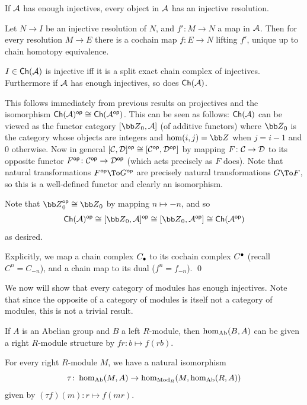 \blemm

    If ${{\cal A}}$ has enough injectives, every object in ${{\cal A}}$ has an injective resolution.

\elemm

\bthrm[title=Comparison theorem]

    Let $N\to I$ be an injective resolution of $N$, and $f'\colon M\to N$ a map in ${{\cal A}}$.
    Then for every resolution $M\to E$ there is a cochain map $f\colon E\to N$ lifting $f'$, unique up to chain homotopy equivalence.

\ethrm

\bprop

    $I\in{\sf Ch}({{\cal A}})$ is injective iff it is a split exact chain complex of injectives.
    Furthermore if ${{\cal A}}$ has enough injectives, so does ${\sf Ch}({{\cal A}})$.

\eprop

\bproof

    This follows immediately from previous results on projectives and the isomorphism ${\sf Ch}({{\cal A}})^{\sf op}\cong{\sf Ch}({{\cal A}}^{\sf op})$.
    This can be seen as follows: ${\sf Ch}({{\cal A}})$ can be viewed as the functor category $[\bZ_0,\A]$ (of additive functors) where $\bZ_0$ is the category whose objects are integers and $\hom(i,j)=\bZ$ when $j=i-1$
    and $0$ otherwise.
    Now in general $[{{\cal C}},{{\cal D}}]^{\sf op}\cong[{{\cal C}}^{\sf op},{{\cal D}}^{\sf op}]$ by mapping $F\colon{{\cal C}}\to{{\cal D}}$ to its opposite functor $F^{\sf op}\colon{{\cal C}}^{\sf op}\to{{\cal D}}^{\sf op}$ (which acts precisely as $F$ does).
    Note that natural transformations $F^\op\To G^\op$ are precisely natural transformations $G\To F$, so this is a well-defined functor and clearly an isomorphism.

    Note that $\bZ_0^\op\cong\bZ_0$ by mapping $n\mapsto-n$, and so
    $$ \Ch(\A)^\op \cong [\bZ_0,\A]^\op \cong [\bZ_0,\A^\op] \cong \Ch(\A^\op) $$
    as desired.

    Explicitly, we map a chain complex $C_\bullet$ to its cochain complex $C^\bullet$ (recall $C^n=C_{-n}$), and a chain map to its dual ($f^n=f_{-n}$).
    \qed

\eproof

We now will show that every category of modules has enough injectives.
Note that since the opposite of a category of modules is itself not a category of modules, this is not a trivial result.

If $A$ is an Abelian group and $B$ a left $R$-module, then $\hom_{\rm Ab}(B,A)$ can be given a right $R$-module structure by $fr\colon b\mapsto f(rb)$.

\blemm

    For every right $R$-module $M$, we have a natural isomorphism
    $$ \tau\colon\hom_{\rm Ab}(M,A) \to \hom_{{\rm Mod}_R}(M,\hom_{\rm Ab}(R,A)) $$
    given by $(\tau f)(m)\colon r\mapsto f(mr)$.

